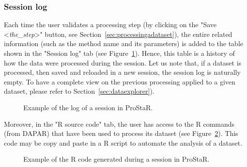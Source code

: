 \documentclass[12pt]{article}
\begin{document}
\subsubsection{Session log}\label{sec:sessionlog}

Each time the user validates a processing step (by clicking on the 
"Save <\emph{the\_step}>" button, see Section~\ref{sec:processingadataset}), 
the entire related information  (such as the method name and its parameters) 
is added to the table shown in the "Session log" tab 
(see Figure~\ref{fig:sessionlog}). Hence, this table is a history of how the 
data were processed during the session. 
Let us note that, if a dataset is processed, then saved and reloaded in a 
new session, the session log is naturally empty. To have a complete view on 
the previous processing applied to a given dataset, please refer to 
Section~\ref{sec:dataexplorer}).

\begin{figure}[b]
\centering
{}
\caption{Example of the log of a session in ProStaR.}\label{fig:sessionlog}
\end {figure}

Moreover, in the "R source code" tab, the user has access to the R commands 
(from DAPAR) that have been used to process its dataset 
(see Figure~\ref{fig:Rcode}). This code may be copy and paste in a R script to 
automate the analysis of a dataset.

\begin{figure}[b]
\centering
{}
\caption{Example of the R code generated during a session in ProStaR.}\label{fig:Rcode}
\end {figure}
\end{document}

